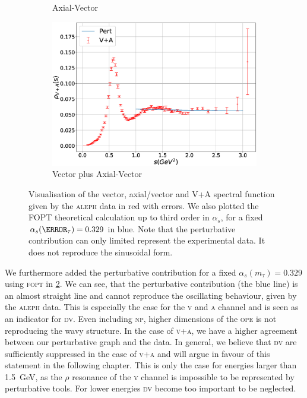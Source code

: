 \documentclass[../../index.tex]{subfiles}
\begin{document}
\begin{figure}
\begin{subfigure}[b]{0.49\textwidth}
    \caption{Axial-Vector}
    \label{fig:alephA}
  \end{subfigure}
  \begin{subfigure}[b]{\textwidth}
    \centering
    \includegraphics[width=\textwidth]{./images/specFuncAleph_VpA.eps}
    \caption{Vector plus Axial-Vector}
    \label{fig:alephVPlusA}
  \end{subfigure}
  \caption{Visualisation of the vector, axial\-/vector and V+A spectral function
    given by the \textsc{aleph} data \cite{Davier2013} in red with errors. We
    also plotted the \textsc{FOPT} theoretical calculation up to third order in
    \(\alpha_s\), for a fixed \(\alpha_s(\m_\tau)=0.329\) in blue. Note that the
    perturbative contribution can only limited represent the experimental data.
    It does not reproduce the sinusoidal form.}
  \label{fig:aleph}
\end{figure}

We furthermore added the perturbative contribution for a fixed
\(\alpha_s(m_\tau)=0.329\) using \textsc{fopt} in \cref{fig:alephVPlusA}. We can
see, that the perturbative contribution (the blue line) is an almost straight
line and cannot reproduce the oscillating behaviour, given by the \textsc{aleph}
data. This is especially the case for the \textsc{v} and \textsc{a} channel and
is seen as an indicator for \textsc{dv}. Even including \textsc{np}, higher
dimensions of the \textsc{ope} is not reproducing the wavy structure. In the
case of \textsc{v+a}, we have a higher agreement between our perturbative graph
and the data. In general, we believe that \textsc{dv} are sufficiently suppressed
in the case of \textsc{v+a} and will argue in favour of this statement in the
following chapter. This is only the case for energies larger than
\SI{1.5}{\giga\eV}, as the \(\rho\) resonance of the \textsc{v} channel is
impossible to be represented by perturbative tools. For lower energies
\textsc{dv} become too important to be neglected.
\end{document}
